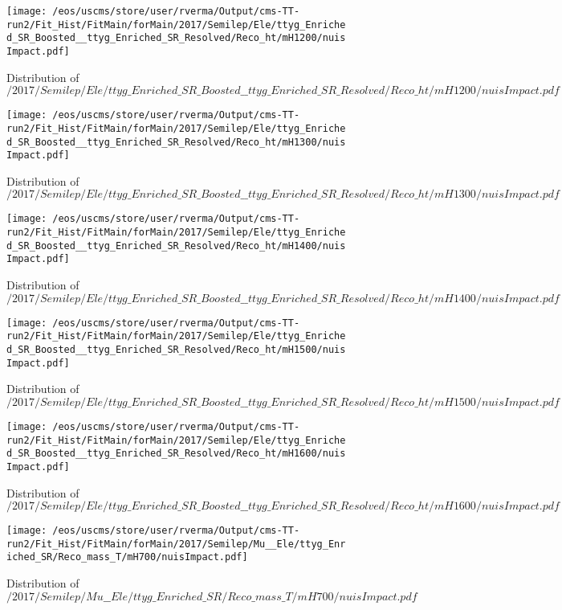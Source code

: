 \begin{figure}
\centering
\texttt{[image: /eos/uscms/store/user/rverma/Output/cms-TT-run2/Fit\_Hist/FitMain/forMain/2017/Semilep/Ele/ttyg\_Enriched\_SR\_Boosted\_\_ttyg\_Enriched\_SR\_Resolved/Reco\_ht/mH1200/nuisImpact.pdf]}
\caption{Distribution of $/2017/Semilep/Ele/ttyg\_Enriched\_SR\_Boosted\_\_ttyg\_Enriched\_SR\_Resolved/Reco\_ht/mH1200/nuisImpact.pdf$}
\end{figure}

\begin{figure}
\centering
\texttt{[image: /eos/uscms/store/user/rverma/Output/cms-TT-run2/Fit\_Hist/FitMain/forMain/2017/Semilep/Ele/ttyg\_Enriched\_SR\_Boosted\_\_ttyg\_Enriched\_SR\_Resolved/Reco\_ht/mH1300/nuisImpact.pdf]}
\caption{Distribution of $/2017/Semilep/Ele/ttyg\_Enriched\_SR\_Boosted\_\_ttyg\_Enriched\_SR\_Resolved/Reco\_ht/mH1300/nuisImpact.pdf$}
\end{figure}

\begin{figure}
\centering
\texttt{[image: /eos/uscms/store/user/rverma/Output/cms-TT-run2/Fit\_Hist/FitMain/forMain/2017/Semilep/Ele/ttyg\_Enriched\_SR\_Boosted\_\_ttyg\_Enriched\_SR\_Resolved/Reco\_ht/mH1400/nuisImpact.pdf]}
\caption{Distribution of $/2017/Semilep/Ele/ttyg\_Enriched\_SR\_Boosted\_\_ttyg\_Enriched\_SR\_Resolved/Reco\_ht/mH1400/nuisImpact.pdf$}
\end{figure}

\begin{figure}
\centering
\texttt{[image: /eos/uscms/store/user/rverma/Output/cms-TT-run2/Fit\_Hist/FitMain/forMain/2017/Semilep/Ele/ttyg\_Enriched\_SR\_Boosted\_\_ttyg\_Enriched\_SR\_Resolved/Reco\_ht/mH1500/nuisImpact.pdf]}
\caption{Distribution of $/2017/Semilep/Ele/ttyg\_Enriched\_SR\_Boosted\_\_ttyg\_Enriched\_SR\_Resolved/Reco\_ht/mH1500/nuisImpact.pdf$}
\end{figure}

\begin{figure}
\centering
\texttt{[image: /eos/uscms/store/user/rverma/Output/cms-TT-run2/Fit\_Hist/FitMain/forMain/2017/Semilep/Ele/ttyg\_Enriched\_SR\_Boosted\_\_ttyg\_Enriched\_SR\_Resolved/Reco\_ht/mH1600/nuisImpact.pdf]}
\caption{Distribution of $/2017/Semilep/Ele/ttyg\_Enriched\_SR\_Boosted\_\_ttyg\_Enriched\_SR\_Resolved/Reco\_ht/mH1600/nuisImpact.pdf$}
\end{figure}

\begin{figure}
\centering
\texttt{[image: /eos/uscms/store/user/rverma/Output/cms-TT-run2/Fit\_Hist/FitMain/forMain/2017/Semilep/Mu\_\_Ele/ttyg\_Enriched\_SR/Reco\_mass\_T/mH700/nuisImpact.pdf]}
\caption{Distribution of $/2017/Semilep/Mu\_\_Ele/ttyg\_Enriched\_SR/Reco\_mass\_T/mH700/nuisImpact.pdf$}
\end{figure}

